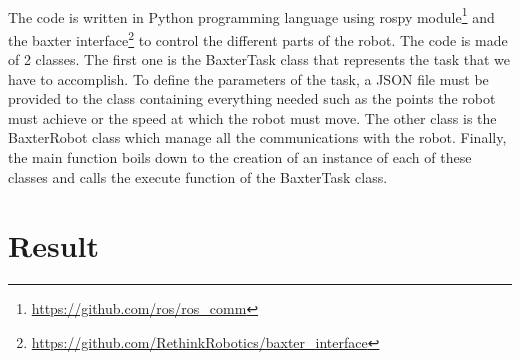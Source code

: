 \paragraph{}The code is written in Python programming language using rospy module\footnote{\url{https://github.com/ros/ros_comm}} and the baxter interface\footnote{\url{https://github.com/RethinkRobotics/baxter_interface}} to control the different parts of the robot. The code is made of 2 classes. The first one is the BaxterTask class that represents the task that we have to accomplish. To define the parameters of the task, a JSON file must be provided to the class containing everything needed such as the points the robot must achieve or the speed at which the robot must move. The other class is the BaxterRobot class which manage all the communications with the robot. Finally, the main function boils down to the creation of an instance of each of these classes and calls the execute function of the BaxterTask class.



\section{Result}
